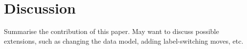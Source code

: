% 
% 

\section{Discussion}
Summarise the contribution of this paper. May want to discuss possible extensions, such as changing the data model, adding label-switching moves, etc.




